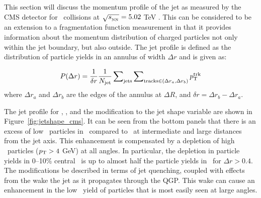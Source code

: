 
This section will discuss the momentum profile of the jet as measured by the CMS detector for \pbpb\ collisions at $\mbox{$\sqrt{s_{_\text{NN}}}$} = 5.02$ TeV \cite{Sirunyan:2018jqr}.
This can be considered to be an extension to a fragmentation function measurement in that it provides information about the momentum distribution of charged particles not only within the jet boundary, but also outside.
The jet profile is defined as the distribution of particle yields in an annulus of width $\Delta r$ and is given as:

\begin{align}
P(\Delta r) = \frac{1}{\delta r} \frac{1}{\mbox{$N_{\mathrm{jet}}$}} \sum\nolimits_{\rm jets}  \sum\nolimits_{{\rm tracks} \in (\Delta r_a, \Delta r_b)} \mbox{$p_{{\mathrm{T}}}^{\mathrm{trk}}$}   
\end{align}
where $\Delta r_a$ and $\Delta r_b$ are the edges of the annulus at $\Delta R$, and $\delta r = \Delta r_b - \Delta r_a$.

The jet profile for \pp, \pbpb, and the modification to the jet shape variable are shown in Figure~\ref{fig:jetshape_cms}.
It can be seen from the bottom panels that there is an excess of low \pt\ particles in \pbpb\ compared to \pp\ at intermediate and large distances from the jet axis.
This enhancement is compensated by a depletion of high \pt\ particles ($\mbox{$p_{\mathrm{T}}$} > 4$ GeV) at all angles.
In particular, the depletion in particle yields in 0--10\% central \pbpb\ is up to almost half the particle yields in \pp\ for $\Delta r > 0.4$.
The modifications be described in terms of jet quenching, coupled with effects from the wake the jet as it propagates through the QGP.
This wake can cause an enhancement in the low \pt\ yield of particles that is most easily seen at large angles.

